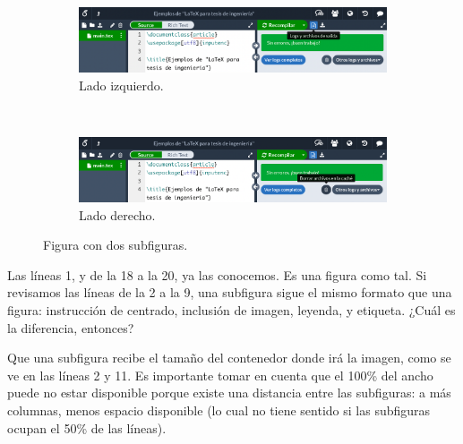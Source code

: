 \begin{figure}[ht!]
	\begin{subfigure}[ht!]{.5\linewidth} %
		\centering
		\includegraphics[width=.95\linewidth]{img/overleaf_boton_log_300ppi.png}
		\caption{Lado izquierdo.}
		\label{fig:sub_1}
	\end{subfigure} %
	~ %
	\begin{subfigure}[ht!]{.5\linewidth}
		\centering
		\includegraphics[width=.95\linewidth]{img/overleaf_boton_cache_300ppi.png}
		\caption{Lado derecho.}
		\label{fig:sub_2}
	\end{subfigure}
	\caption{Figura con dos subfiguras.}
	\label{fig:figure_subfigure}
\end{figure}

Las líneas 1, y de la 18 a la 20, ya las conocemos. Es una figura como tal. Si revisamos las líneas de la 2 a la 9, una subfigura sigue el mismo formato que una figura: instrucción de centrado, inclusión de imagen, leyenda, y etiqueta. ¿Cuál es la diferencia, entonces?

Que una subfigura recibe el tamaño del contenedor donde irá la imagen, como se ve en las líneas 2 y 11. Es importante tomar en cuenta que el 100\% del ancho puede no estar disponible porque existe una distancia entre las subfiguras: a más columnas, menos espacio disponible (lo cual no tiene sentido si las subfiguras ocupan el 50\% de las líneas).

